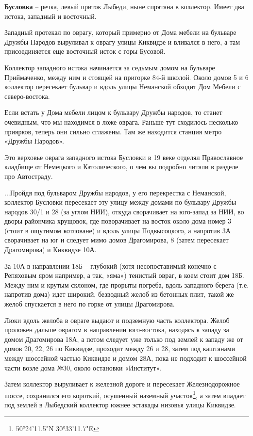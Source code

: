 \textbf{Бусловка} – речка, левый приток Лыбеди, ныне спрятана в коллектор. Имеет два истока, западный и восточный.

Западный протекал по оврагу, который примерно от Дома мебели на бульваре Дружбы Народов выруливал к оврагу улицы Киквидзе и вливался в него, а там присоединяется еще восточный исток с горы Бусовой.

Коллектор западного истока начинается за седьмым домом на бульваре Приймаченко, между ним и стоящей на пригорке 84-й школой. Около домов 5 и 6 коллектор пересекает бульвар и вдоль улицы Неманской обходит Дом Мебели с северо-востока.

Если встать у Дома мебели лицом к бульвару Дружбы народов, то станет очевидным, что мы находимся в ложе оврага. Раньше тут сходилось несколько приярков, теперь они сильно сглажены. Там же находится станция метро «Дружбы Народов». 

Это верховье оврага западного истока Бусловки в 19 веке отделял Православное кладбище от Немецкого и Католического, о чем вы подробно читали в разделе про Автостраду.

...Пройдя под бульваром Дружбы народов, у его перекрестка с Неманской, коллектор Бусловки пересекает эту улицу между домами по бульвару Дружбы народов 30/1 и 28 (за углом НИИ), откуда сворачивает на юго-запад за НИИ, во дворы райончика хрущовок, где поворачивает на восток около дома номер 3 (стоит в ощутимом котловане) и вдоль улицы Подвысоцкого, а напротив 3А сворачивает на юг и следует мимо домов Драгомирова, 8 (затем пересекает Драгомирова) и Киквидзе 10А.

За 10А в направлении 18Б – глубокий (хотя несопоставимый конечно с Репяховым яром например, а так, «яма») тенистый овраг, в коем стоит дом 18Б. Между ним и крутым склоном, где прорыты погреба, вдоль западного берега (т.е. напротив дома) идет широкий, безводный желоб из бетонных плит, такой же желоб спускается в него по горке от улицы Драгомирова.  

Люки вдоль желоба в овраге выдают и подземную часть коллектора. Желоб проложен дальше оврагом в направлении юго-востока, находясь к западу за домом Драгомирова 18А, а потом следует уже только под землей к западу же от домов 20, 22, 26 по Киквидзе, проходит между 26 и 28, затем под каштанами между шоссейной частью Киквидзе и домом 28А, пока не подходит к шоссейной части возле дома №30, около остановки «Институт».

Затем коллектор выруливает к железной дороге и пересекает Железнодорожное шоссе, сохранился его короткий, осушенный наземный участок\footnote{50°24'11.5"N 30°33'11.7"E}, а затем впадает под землей в Лыбедский коллектор южнее эстакады низовья улицы Киквидзе.

